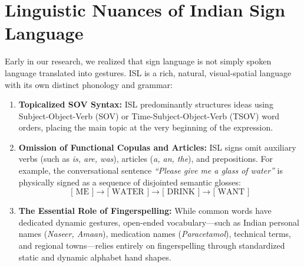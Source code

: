 \section{Linguistic Nuances of Indian Sign Language}
Early in our research, we realized that sign language is not simply spoken language translated into gestures. ISL is a rich, natural, visual-spatial language with its own distinct phonology and grammar:
\begin{enumerate}
    \item \textbf{Topicalized SOV Syntax:} ISL predominantly structures ideas using Subject-Object-Verb (SOV) or Time-Subject-Object-Verb (TSOV) word orders, placing the main topic at the very beginning of the expression.
    \item \textbf{Omission of Functional Copulas and Articles:} ISL signs omit auxiliary verbs (such as \textit{is, are, was}), articles (\textit{a, an, the}), and prepositions. For example, the conversational sentence \textit{``Please give me a glass of water''} is physically signed as a sequence of disjointed semantic glosses:
    \begin{equation}
        \text{[ ME ]} \longrightarrow \text{[ WATER ]} \longrightarrow \text{[ DRINK ]} \longrightarrow \text{[ WANT ]}
    \end{equation}
    \item \textbf{The Essential Role of Fingerspelling:} While common words have dedicated dynamic gestures, open-ended vocabulary---such as Indian personal names (\textit{Naseer, Amaan}), medication names (\textit{Paracetamol}), technical terms, and regional towns---relies entirely on fingerspelling through standardized static and dynamic alphabet hand shapes.
\end{enumerate}

